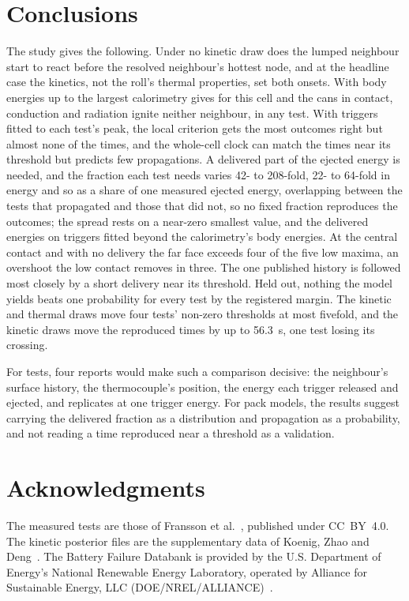 \documentclass[preprint,12pt]{elsarticle}
\begin{document}
\section{Conclusions}
\label{sec:conclusions}

The study gives the following. Under no kinetic draw does the lumped neighbour start to react before the resolved neighbour's hottest node, and at the headline case the kinetics, not the roll's thermal properties, set both onsets. With body energies up to the largest calorimetry gives for this cell and the cans in contact, conduction and radiation ignite neither neighbour, in any test. With triggers fitted to each test's peak, the local criterion gets the most outcomes right but almost none of the times, and the whole-cell clock can match the times near its threshold but predicts few propagations. A delivered part of the ejected energy is needed, and the fraction each test needs varies 42- to 208-fold, 22- to 64-fold in energy and so as a share of one measured ejected energy, overlapping between the tests that propagated and those that did not, so no fixed fraction reproduces the outcomes; the spread rests on a near-zero smallest value, and the delivered energies on triggers fitted beyond the calorimetry's body energies. At the central contact and with no delivery the far face exceeds four of the five low maxima, an overshoot the low contact removes in three. The one published history is followed most closely by a short delivery near its threshold. Held out, nothing the model yields beats one probability for every test by the registered margin. The kinetic and thermal draws move four tests' non-zero thresholds at most fivefold, and the kinetic draws move the reproduced times by up to 56.3~s, one test losing its crossing.

For tests, four reports would make such a comparison decisive: the neighbour's surface history, the thermocouple's position, the energy each trigger released and ejected, and replicates at one trigger energy. For pack models, the results suggest carrying the delivered fraction as a distribution and propagation as a probability, and not reading a time reproduced near a threshold as a validation.

\section*{Acknowledgments}

The measured tests are those of Fransson et al.~\cite{fransson2024exploring}, published under CC~BY~4.0. The kinetic posterior files are the supplementary data of Koenig, Zhao and Deng~\cite{koenig2025uncertainty}. The Battery Failure Databank is provided by the U.S. Department of Energy's National Renewable Energy Laboratory, operated by Alliance for Sustainable Energy, LLC (DOE/\allowbreak NREL/\allowbreak ALLIANCE)~\cite{finegan2024databank}.
\end{document}
